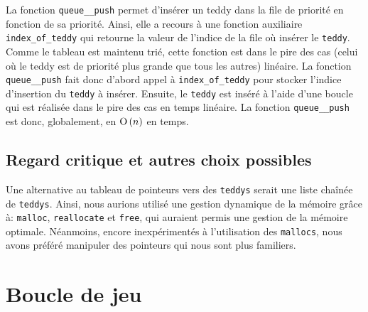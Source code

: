 \documentclass[12pt]{article}
\begin{document}
\begin{itemize}
        La fonction \texttt{queue\_\_push} permet d'insérer un teddy dans la file de priorité en fonction de sa priorité. Ainsi, elle a recours à une fonction auxiliaire \texttt{index\_of\_teddy} qui retourne la valeur de l'indice de la file où insérer le \texttt{teddy}. Comme le tableau est maintenu trié, cette fonction est dans le pire des cas (celui où le teddy est de priorité plus grande que tous les autres) linéaire. La fonction \texttt{queue\_\_push} fait donc d'abord appel à \texttt{index\_of\_teddy} pour stocker l'indice d'insertion du \texttt{teddy} à insérer. Ensuite, le \texttt{teddy} est inséré à l'aide d'une boucle qui est réalisée dans le pire des cas en temps linéaire. La fonction \texttt{queue\_\_push} est donc, globalement, en ${\text{O}}\left(n\right)$ en temps.\\
        \end{itemize}
        \subsection{Regard critique et autres choix possibles}
       Une alternative au tableau de pointeurs vers des \texttt{teddys} serait une liste chaînée de \texttt{teddys}. Ainsi, nous aurions utilisé une gestion dynamique de la mémoire grâce à: \texttt{malloc}, \texttt{reallocate} et \texttt{free}, qui auraient permis une gestion de la mémoire optimale. Néanmoins, encore inexpérimentés à l'utilisation des \texttt{mallocs}, nous avons préféré manipuler des pointeurs qui nous sont plus familiers.\\
        \section{Boucle de jeu}
        
\end{document}
